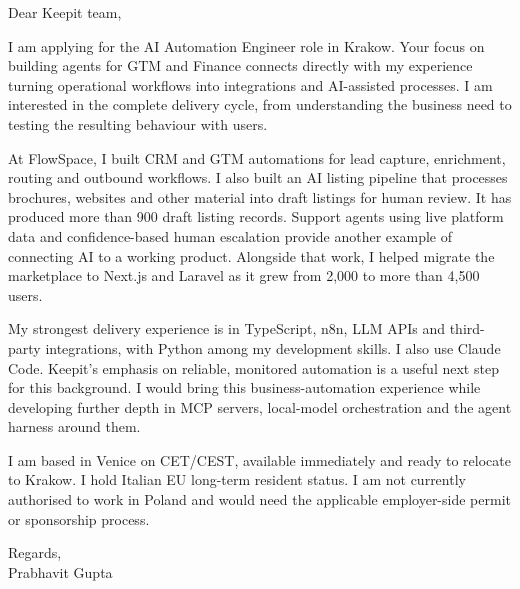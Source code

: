 \documentclass[a4paper,11pt]{article}
\begin{document}
Dear Keepit team,

I am applying for the AI Automation Engineer role in Krakow. Your focus on building agents for GTM and Finance connects directly with my experience turning operational workflows into integrations and AI-assisted processes. I am interested in the complete delivery cycle, from understanding the business need to testing the resulting behaviour with users.

At FlowSpace, I built CRM and GTM automations for lead capture, enrichment, routing and outbound workflows. I also built an AI listing pipeline that processes brochures, websites and other material into draft listings for human review. It has produced more than 900 draft listing records. Support agents using live platform data and confidence-based human escalation provide another example of connecting AI to a working product. Alongside that work, I helped migrate the marketplace to Next.js and Laravel as it grew from 2,000 to more than 4,500 users.

My strongest delivery experience is in TypeScript, n8n, LLM APIs and third-party integrations, with Python among my development skills. I also use Claude Code. Keepit's emphasis on reliable, monitored automation is a useful next step for this background. I would bring this business-automation experience while developing further depth in MCP servers, local-model orchestration and the agent harness around them.

I am based in Venice on CET/CEST, available immediately and ready to relocate to Krakow. I hold Italian EU long-term resident status. I am not currently authorised to work in Poland and would need the applicable employer-side permit or sponsorship process.

Regards,\\
Prabhavit Gupta
\end{document}
